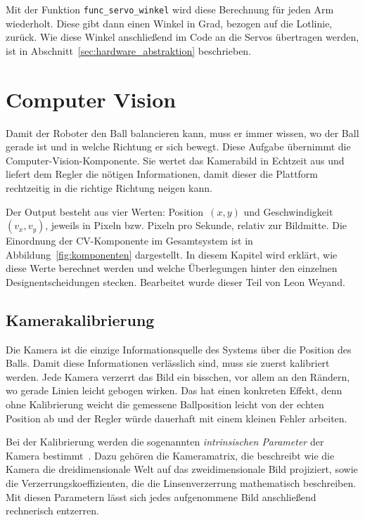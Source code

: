 \documentclass[11pt, a4paper]{scrreprt}
\begin{document}
Mit der Funktion \texttt{func\_servo\_winkel} wird diese Berechnung für jeden Arm wiederholt. Diese gibt
dann einen Winkel in Grad, bezogen auf die Lotlinie, zurück.
Wie diese Winkel anschließend im Code an die Servos übertragen werden, ist in
Abschnitt~\ref{sec:hardware_abstraktion} beschrieben.

\chapter{Computer Vision}


Damit der Roboter den Ball balancieren kann, muss er immer wissen, wo
der Ball gerade ist und in welche Richtung er sich bewegt. Diese Aufgabe
übernimmt die Computer-Vision-Komponente. Sie wertet das Kamerabild in
Echtzeit aus und liefert dem Regler die nötigen Informationen, damit dieser
die Plattform rechtzeitig in die richtige Richtung neigen kann.

Der Output besteht aus vier Werten: Position~$(x, y)$ und
Geschwindigkeit~$(v_x, v_y)$, jeweils in Pixeln bzw. Pixeln pro Sekunde,
relativ zur Bildmitte. Die Einordnung der CV-Komponente im Gesamtsystem
ist in Abbildung~\ref{fig:komponenten} dargestellt. In diesem Kapitel
wird erklärt, wie diese Werte berechnet werden und welche Überlegungen
hinter den einzelnen Designentscheidungen stecken.
Bearbeitet wurde dieser Teil von Leon Weyand.

\section{Kamerakalibrierung}

Die Kamera ist die einzige Informationsquelle des Systems über die Position
des Balls. Damit diese Informationen verlässlich sind, muss sie zuerst
kalibriert werden. Jede Kamera verzerrt das Bild ein bisschen, vor allem
an den Rändern, wo gerade Linien leicht gebogen wirken. Das hat einen
konkreten Effekt, denn ohne Kalibrierung weicht die gemessene Ballposition
leicht von der echten Position ab und der Regler würde dauerhaft mit
einem kleinen Fehler arbeiten.

Bei der Kalibrierung werden die sogenannten \textit{intrinsischen Parameter}
der Kamera bestimmt~\cite{intrinsic_parameters}. Dazu gehören die Kameramatrix, die beschreibt wie die
Kamera die dreidimensionale Welt auf das zweidimensionale Bild projiziert,
sowie die Verzerrungskoeffizienten, die die Linsenverzerrung mathematisch
beschreiben. Mit diesen Parametern lässt sich jedes aufgenommene Bild
anschließend rechnerisch entzerren.
\end{document}
